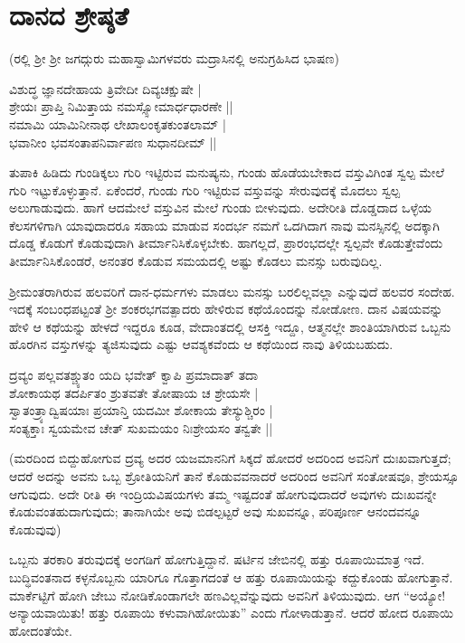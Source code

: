 \chapter{ದಾನದ ಶ್ರೇಷ್ಠತೆ}\label{chap14}

({}ರಲ್ಲಿ ಶ್ರೀ ಶ್ರೀ ಜಗದ್ಗುರು ಮಹಾಸ್ವಾಮಿಗಳವರು ಮದ್ರಾಸಿನಲ್ಲಿ ಅನುಗ್ರಹಿಸಿದ ಭಾಷಣ)

\begin{shloka}
ವಿಶುದ್ಧ ಜ್ಞಾನದೇಹಾಯ ತ್ರಿವೇದೀ ದಿವ್ಯಚಕ್ಷುಷೇ |\\
ಶ್ರೇಯಃ ಪ್ರಾಪ್ತಿ ನಿಮಿತ್ತಾಯ ನಮಸ್ಸ್ಸೋಮಾರ್ಧಧಾರಣೇ ||\\
ನಮಾಮಿ ಯಾಮಿನೀನಾಥ ಲೇಖಾಲಂಕೃತಕುಂತಲಾಮ್ |\\
ಭವಾನೀಂ ಭವಸಂತಾಪನಿರ್ವಾಪಣ ಸುಧಾನದೀಮ್ ||
\end{shloka}

ತುಪಾಕಿ ಹಿಡಿದು ಗುಂಡಿಕ್ಕಲು ಗುರಿ ಇಟ್ಟಿರುವ ಮನುಷ್ಯನು, ಗುಂಡು ಹೊಡೆಯಬೇಕಾದ ವಸ್ತುವಿಗಿಂತ ಸ್ವಲ್ಪ ಮೇಲೆ ಗುರಿ ಇಟ್ಟುಕೊಳ್ಳುತ್ತಾನೆ. ಏಕೆಂದರೆ, ಗುಂಡು ಗುರಿ ಇಟ್ಟಿರುವ ವಸ್ತುವನ್ನು ಸೇರುವುದಕ್ಕೆ ಮೊದಲು ಸ್ವಲ್ಪ ಅಲುಗಾಡುವುದು. ಹಾಗೆ ಆದಮೇಲೆ ವಸ್ತುವಿನ ಮೇಲೆ ಗುಂಡು ಬೀಳುವುದು. ಅದೇರೀತಿ ದೊಡ್ಡದಾದ ಒಳ್ಳೆಯ ಕೆಲಸಗಳಿಗಾಗಿ ಯಾವುದಾದರೂ ಸಹಾಯ ಮಾಡುವ ಸಂದರ್ಭ ನಮಗೆ ಒದಗಿದಾಗ ನಾವು ಮನಸ್ಸಿನಲ್ಲಿ ಅದಕ್ಕಾಗಿ ದೊಡ್ಡ ಕೊಡುಗೆ ಕೊಡುವುದಾಗಿ ತೀರ್ಮಾನಿಸಿಕೊಳ್ಳಬೇಕು. ಹಾಗಲ್ಲದೆ, ಪ್ರಾರಂಭದಲ್ಲೇ ಸ್ವಲ್ಪವೇ ಕೊಡುತ್ತೇವೆಂದು ತೀರ್ಮಾನಿಸಿಕೊಂಡರೆ, ಅನಂತರ ಕೊಡುವ ಸಮಯದಲ್ಲಿ ಅಷ್ಟು ಕೊಡಲು ಮನಸ್ಸು ಬರುವುದಿಲ್ಲ.

ಶ್ರೀಮಂತರಾಗಿರುವ ಹಲವರಿಗೆ ದಾನ-ಧರ್ಮಗಳು ಮಾಡಲು ಮನಸ್ಸು ಬರಲಿಲ್ಲವಲ್ಲಾ ಎನ್ನುವುದೆ ಹಲವರ ಸಂದೇಹ. ಇದಕ್ಕೆ ಸಂಬಂಧಪಟ್ಟಂತೆ ಶ್ರೀ ಶಂಕರಭಗವತ್ಪಾದರು ಹೇಳಿರುವ ಕಥೆಯೊಂದನ್ನು ನೋಡೋಣ. ದಾನ ವಿಷಯವನ್ನು ಹೇಳಿ ಆ ಕಥೆಯನ್ನು ಹೇಳದೆ ಇದ್ದರೂ ಕೂಡ, ವೇದಾಂತದಲ್ಲಿ ಆಸಕ್ತಿ ಇದ್ದೂ, ಆತ್ಮನಲ್ಲೇ ಶಾಂತಿಯಾಗಿರುವ ಒಬ್ಬನು ಹೊರಗಿನ ವಸ್ತುಗಳನ್ನು ತ್ಯಜಿಸುವುದು ಎಷ್ಟು ಆವಶ್ಯಕವೆಂದು ಆ ಕಥೆಯಿಂದ ನಾವು ತಿಳಿಯಬಹುದು.

\begin{shloka}
ದ್ರವ್ಯಂ ಪಲ್ಲವತಶ್ಚ್ಯುತಂ ಯದಿ ಭವೇತ್ ಕ್ವಾಪಿ ಪ್ರಮಾದಾತ್ ತದಾ\\
ಶೋಕಾಯಥ ತದರ್ಪಿತಂ ಶ್ರುತವತೇ ತೋಷಾಯ ಚ ಶ್ರೇಯಸೇ |\\
ಸ್ವಾತಂತ್ರ್ಯಾದ್ವಿಷಯಾಃ ಪ್ರಯಾನ್ತಿ ಯದಮೀ ಶೋಕಾಯ ತೇಸ್ಯುಶ್ಚಿರಂ |\\
ಸಂತ್ಯಕ್ತಾಃ ಸ್ವಯಮೇವ ಚೇತ್ ಸುಖಮಯಂ ನಿಃಶ್ರೇಯಸಂ ತನ್ವತೇ ||
\end{shloka}

(ಮರದಿಂದ ಬಿದ್ದುಹೋಗುವ ದ್ರವ್ಯ ಅದರ ಯಜಮಾನನಿಗೆ ಸಿಕ್ಕದೆ ಹೋದರೆ ಅದರಿಂದ ಅವನಿಗೆ ದುಃಖವಾಗುತ್ತದೆ; ಆದರೆ ಅದನ್ನು ಅವನು ಒಬ್ಬ ಶ್ರೋತಿಯನಿಗೆ ತಾನೆ ಕೊಡುವವನಾದರೆ ಅದರಿಂದ ಅವನಿಗೆ ಸಂತೋಷವೂ, ಶ್ರೇಯಸ್ಸೂ ಆಗುವುದು. ಅದೇ ರೀತಿ ಈ ಇಂದ್ರಿಯವಿಷಯಗಳು ತಮ್ಮ ಇಷ್ಟದಂತೆ ಹೋಗುವುದಾದರೆ ಅವುಗಳು ದುಃಖವನ್ನೇ ಕೊಡುವಂತಹುದಾಗುವುದು; ತಾನಾಗಿಯೇ ಅವು ಬಿಡಲ್ಪಟ್ಟರೆ ಅವು ಸುಖವನ್ನೂ, ಪರಿಪೂರ್ಣ ಆನಂದವನ್ನೂ ಕೊಡುವುವು)

ಒಬ್ಬನು ತರಕಾರಿ ತರುವುದಕ್ಕೆ ಅಂಗಡಿಗೆ ಹೋಗುತ್ತಿದ್ದಾನೆ. ಷರ್ಟಿನ ಜೇಬಿನಲ್ಲಿ ಹತ್ತು ರೂಪಾಯಿಮಾತ್ರ ಇದೆ. ಬುದ್ಧಿವಂತನಾದ ಕಳ್ಳನೊಬ್ಬನು ಯಾರಿಗೂ ಗೊತ್ತಾಗದಂತೆ ಆ ಹತ್ತು ರೂಪಾಯಿಯನ್ನು ಕದ್ದುಕೊಂಡು ಹೋಗುತ್ತಾನೆ. ಮಾರ್ಕೆಟ್ಟಿಗೆ ಹೋಗಿ ಜೇಬು ನೋಡಿಕೊಂಡಾಗಲೇ ಹಣವಿಲ್ಲವೆನ್ನುವುದು ಅವನಿಗೆ ತಿಳಿಯುವುದು. ಆಗ ``ಅಯ್ಯೋ! ಅನ್ಯಾಯವಾಯಿತು! ಹತ್ತು ರೂಪಾಯಿ ಕಳುವಾಗಿಹೋಯಿತು'' ಎಂದು ಗೋಳಾಡುತ್ತಾನೆ. ಆದರೆ ಹೋದ ರೂಪಾಯಿ ಹೋದಂತೆಯೇ.

